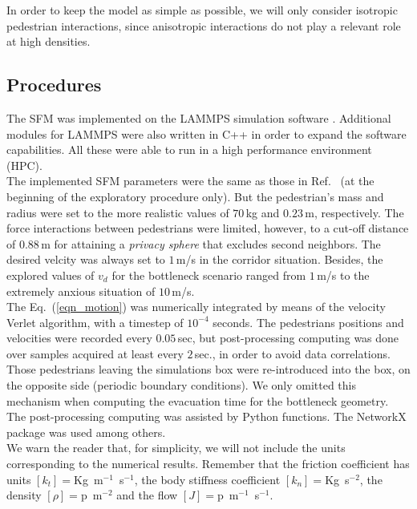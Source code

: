 \documentclass[preprint,12pt]{elsarticle}
\begin{document}
In order to keep the model as simple as possible, we will only consider
isotropic pedestrian interactions, since anisotropic interactions do not play a
relevant role at high densities. \\



\subsection{Procedures} 

The SFM was implemented on the LAMMPS simulation software \cite{plimpton}.
Additional modules for LAMMPS were also written in C++ in order to expand the
software capabilities. All these were able to run in a high performance
environment (HPC). \\


The implemented SFM parameters were the same as those in
Ref.~\cite{helbing_2000} (at the beginning of the exploratory procedure only).
But the pedestrian's mass and radius were set to the more realistic values of
$70\,$kg and $0.23\,$m, respectively. The force interactions between
pedestrians were limited, however, to a cut-off distance of $0.88\,$m for
attaining a \textit{privacy sphere} that excludes second neighbors. The desired
velcity was always set to $1\,$m/s in the corridor situation. Besides, the
explored values of $v_d$ for the bottleneck scenario ranged from $1\,$m/s to the
extremely anxious situation of $10\,$m/s. \\


The Eq.~(\ref{eqn_motion}) was numerically integrated by means of the velocity
Verlet algorithm, with a timestep of $10^{-4}$ seconds. The pedestrians
positions and velocities were recorded every $0.05\,$sec, but post-processing
computing was done over samples acquired at least every $2\,$sec., in order to
avoid  data correlations. Those pedestrians leaving the simulations box were
re-introduced into the box, on the opposite side (periodic boundary
conditions). We only omitted this mechanism when computing the evacuation time
for the bottleneck geometry. \\

The post-processing computing was assisted by Python functions. The NetworkX
package was used among others.   \\


We warn the reader that, for simplicity, we will not include the units
corresponding to the numerical results. Remember that the friction coefficient
has units $\left [ k_t \right]=$Kg~m$^{-1}$~s$^{-1}$, 
the body stiffness coefficient $\left [ k_n \right]=$Kg~s$^{-2}$, 
the density $\left [ \rho \right]=$p~m$^{-2}$ and the flow $\left [ J \right
]=$p~m$^{-1}$~s$^{-1}$.\\
\end{document}
